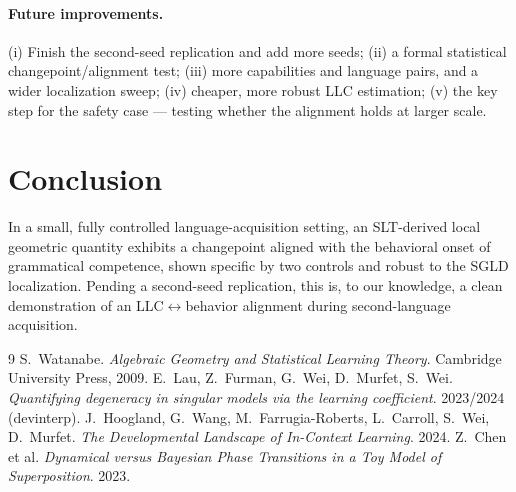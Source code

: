 \documentclass[11pt]{article}
\begin{document}
\paragraph{Future improvements.} (i) Finish the second-seed replication and add
more seeds; (ii) a formal statistical changepoint/alignment test; (iii) more
capabilities and language pairs, and a wider localization sweep; (iv) cheaper,
more robust LLC estimation; (v) the key step for the safety case --- testing
whether the alignment holds at larger scale.

\section{Conclusion}
In a small, fully controlled language-acquisition setting, an SLT-derived local
geometric quantity exhibits a changepoint aligned with the behavioral onset of
grammatical competence, shown specific by two controls and robust to the SGLD
localization. Pending a second-seed replication, this is, to our knowledge, a
clean demonstration of an LLC$\leftrightarrow$behavior alignment during
second-language acquisition.

\begin{thebibliography}{9}
 S.~Watanabe.
  \emph{Algebraic Geometry and Statistical Learning Theory}.
  Cambridge University Press, 2009.
 E.~Lau, Z.~Furman, G.~Wei, D.~Murfet, S.~Wei.
  \emph{Quantifying degeneracy in singular models via the learning coefficient}.
  2023/2024 (devinterp).
 J.~Hoogland, G.~Wang, M.~Farrugia-Roberts, L.~Carroll,
  S.~Wei, D.~Murfet.
  \emph{The Developmental Landscape of In-Context Learning}. 2024.
 Z.~Chen et al.
  \emph{Dynamical versus Bayesian Phase Transitions in a Toy Model of
  Superposition}. 2023.
\end{thebibliography}
\end{document}
